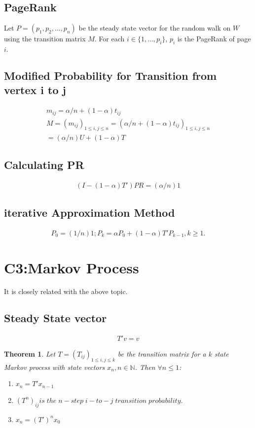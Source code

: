 \documentclass{article}
\newtheorem{thm}{Theorem}
\begin{document}
\begin{spacing}{1.5}
\subsection{PageRank}
Let $P = (p_1,p_2,\dots,p_n)$ be the steady state vector for the random walk on $W$ using the transition matrix $M$. For each $i \in \{1,\dots,p_i\}$, $p_i$ is the PageRank of page $i$. 
\subsection{Modified Probability for Transition from vertex i to j}
\begin{align}
        m_{ij} = \alpha/n + (1-\alpha)t_{ij}\\
        M = (m_{ij})_{1 \le i,j \le n} = (\alpha/n+(1-\alpha)t_{ij})_{1 \le i,j \le n}\\
        = (\alpha/n)U +(1-\alpha)T
\end{align}
\subsection{Calculating PR}
\begin{align}
    (I-(1-\alpha)T')PR = (\alpha/n)1
\end{align}
\subsection{iterative Approximation Method}
\begin{align}
    P_0 = (1/n)1; P_k =\alpha P_0+(1-\alpha)T'P_{k-1}, k \ge1.
\end{align}

\section{C3:Markov Process}
It is closely related with the above topic. 
\subsection{Steady State vector}
\begin{align}
    T'v=v
\end{align}

\begin{thm}
Let $T = (T_{ij})_{1 \le i,j \le k}$ be the transition matrix for a $k$ state Markov process with state vectors $x_n,n \in \mathbb{N} $. Then $\forall n \le 1$:
\begin{enumerate}
    \item $x_n = T'x_{n-1}$
    \item $(T^n)_{ij} is  \;the \;n-step \;i-to-j \; transition\; probability.$
    \item $x_n = (T')^n x_0$
\end{enumerate}
\end{thm}

\end{spacing}
\end{document}
